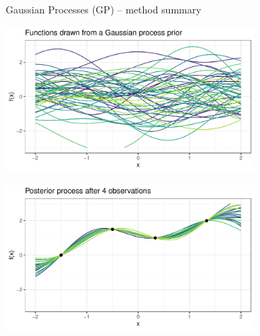 \begin{frame}{Gaussian Processes (GP) -- method summary}
\begin{minipage}[b]{0.5\textwidth}
  \centering
  \includegraphics[width=0.7\textwidth]{figure/gp-prior} \\
\end{minipage}%
\begin{minipage}[b]{0.5\textwidth}
\centering
  \includegraphics[width=0.7\textwidth]{figure/gp-posterior}
\end{minipage}

\end{frame}


